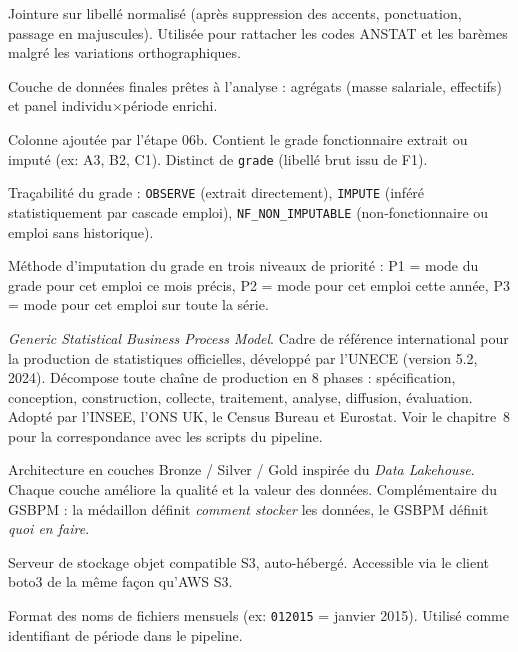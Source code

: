\documentclass[12pt,a4paper,french]{report}
\begin{document}
\begin{description}[leftmargin=3cm, labelwidth=2.8cm, style=nextline]
  \item[Fuzzy join] Jointure sur libellé normalisé (après suppression des
  accents, ponctuation, passage en majuscules). Utilisée pour rattacher les
  codes ANSTAT et les barèmes malgré les variations orthographiques.

  \item[Gold] Couche de données finales prêtes à l'analyse : agrégats
  (masse salariale, effectifs) et panel individu$\times$période enrichi.

  \item[GRADE] Colonne ajoutée par l'étape 06b. Contient le grade fonctionnaire
  extrait ou imputé (ex: A3, B2, C1). Distinct de \texttt{grade} (libellé brut
  issu de F1).

  \item[GRADE\_SOURCE] Traçabilité du grade : \texttt{OBSERVE} (extrait
  directement), \texttt{IMPUTE} (inféré statistiquement par cascade emploi),
  \texttt{NF\_NON\_IMPUTABLE} (non-fonctionnaire ou emploi sans historique).

  \item[Imputation en cascade] Méthode d'imputation du grade en trois niveaux
  de priorité : P1 = mode du grade pour cet emploi ce mois précis,
  P2 = mode pour cet emploi cette année, P3 = mode pour cet emploi sur toute
  la série.

  \item[GSBPM] \textit{Generic Statistical Business Process Model}. Cadre de
  référence international pour la production de statistiques officielles, développé
  par l'UNECE (version 5.2, 2024). Décompose toute chaîne de production en
  8 phases : spécification, conception, construction, collecte, traitement,
  analyse, diffusion, évaluation. Adopté par l'INSEE, l'ONS UK, le Census Bureau
  et Eurostat. Voir le chapitre~8 pour la correspondance avec les scripts du
  pipeline.

  \item[Medallion Architecture] Architecture en couches Bronze / Silver / Gold
  inspirée du \textit{Data Lakehouse}. Chaque couche améliore la qualité et la
  valeur des données. Complémentaire du GSBPM : la médaillon définit
  \textit{comment stocker} les données, le GSBPM définit \textit{quoi en faire}.

  \item[MinIO] Serveur de stockage objet compatible S3, auto-hébergé.
  Accessible via le client boto3 de la même façon qu'AWS S3.

  \item[MMYYYY] Format des noms de fichiers mensuels (ex: \texttt{012015} =
  janvier 2015). Utilisé comme identifiant de période dans le pipeline.


\end{description}
\end{document}
